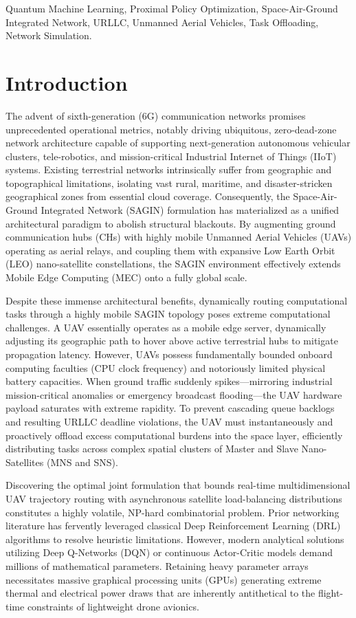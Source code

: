 \documentclass[conference]{IEEEtran}
\begin{document}
\begin{IEEEkeywords}
Quantum Machine Learning, Proximal Policy Optimization, Space-Air-Ground Integrated Network, URLLC, Unmanned Aerial Vehicles, Task Offloading, Network Simulation.
\end{IEEEkeywords}

\section{Introduction}
The advent of sixth-generation (6G) communication networks promises unprecedented operational metrics, notably driving ubiquitous, zero-dead-zone network architecture capable of supporting next-generation autonomous vehicular clusters, tele-robotics, and mission-critical Industrial Internet of Things (IIoT) systems. Existing terrestrial networks intrinsically suffer from geographic and topographical limitations, isolating vast rural, maritime, and disaster-stricken geographical zones from essential cloud coverage. Consequently, the Space-Air-Ground Integrated Network (SAGIN) formulation \cite{kato2019} has materialized as a unified architectural paradigm to abolish structural blackouts. By augmenting ground communication hubs (CHs) with highly mobile Unmanned Aerial Vehicles (UAVs) operating as aerial relays, and coupling them with expansive Low Earth Orbit (LEO) nano-satellite constellations, the SAGIN environment effectively extends Mobile Edge Computing (MEC) onto a fully global scale.

Despite these immense architectural benefits, dynamically routing computational tasks through a highly mobile SAGIN topology poses extreme computational challenges. A UAV essentially operates as a mobile edge server, dynamically adjusting its geographic path to hover above active terrestrial hubs to mitigate propagation latency. However, UAVs possess fundamentally bounded onboard computing faculties (CPU clock frequency) and notoriously limited physical battery capacities. When ground traffic suddenly spikes---mirroring industrial mission-critical anomalies or emergency broadcast flooding---the UAV hardware payload saturates with extreme rapidity. To prevent cascading queue backlogs and resulting URLLC deadline violations, the UAV must instantaneously and proactively offload excess computational burdens into the space layer, efficiently distributing tasks across complex spatial clusters of Master and Slave Nano-Satellites (MNS and SNS).

Discovering the optimal joint formulation that bounds real-time multidimensional UAV trajectory routing with asynchronous satellite load-balancing distributions constitutes a highly volatile, NP-hard combinatorial problem. Prior networking literature has fervently leveraged classical Deep Reinforcement Learning (DRL) algorithms to resolve heuristic limitations. However, modern analytical solutions utilizing Deep Q-Networks (DQN) or continuous Actor-Critic models demand millions of mathematical parameters. Retaining heavy parameter arrays necessitates massive graphical processing units (GPUs) generating extreme thermal and electrical power draws that are inherently antithetical to the flight-time constraints of lightweight drone avionics.
\end{document}
